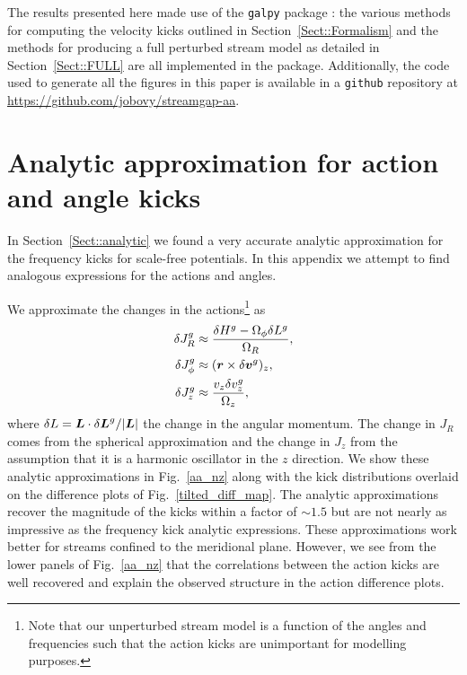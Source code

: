 \documentclass[useAMS,usenatbib,fleqn,a4paper]{mn2e}
\newcommand{\bs}[1]{\bmath{#1}}
\begin{document}
The results presented here made use of the \texttt{galpy} package \citep{galpy}: the various methods for computing the velocity kicks outlined in Section~\ref{Sect::Formalism} and the methods for producing a full perturbed stream model as detailed in Section~\ref{Sect::FULL} are all implemented in the package. Additionally, the code used to generate all the figures in this paper is available in a \texttt{github} repository at \href{https://github.com/jobovy/streamgap-aa}{https://github.com/jobovy/streamgap-aa}.




\appendix

\section{Analytic approximation for action and angle kicks}\label{Appendix::Analytic}
In Section~\ref{Sect::analytic} we found a very accurate analytic approximation for the frequency kicks for scale-free potentials. In this appendix we attempt to find analogous expressions for the actions and angles.

We approximate the changes in the actions\footnote{ Note that our unperturbed stream model is a function of the angles and frequencies such that the action kicks are unimportant for modelling purposes.} as
\begin{equation}
\begin{split}
\delta J^g_R &\approx \frac{\delta H^g - \Omega_\phi\delta L^g}{\Omega_R},\\
\delta J^g_\phi &\approx (\bs{r}\times\delta\bs{v}^g)_z,\\
\delta J^g_z &\approx \frac{v_z \delta v^g_z}{\Omega_z},
\end{split}
\label{dJ_an}
\end{equation}
where $\delta L = \bs{L}\cdot\delta\bs{L}^g/|\bs{L}|$ the change in the angular momentum. The change in $J_R$ comes from the spherical approximation and the change in $J_z$ from the assumption that it is a harmonic oscillator in the $z$ direction. We show these analytic approximations in Fig.~\ref{aa_nz} along with the kick distributions overlaid on the difference plots of Fig.~\ref{tilted_diff_map}. The analytic approximations recover the magnitude of the kicks within a factor of $\sim1.5$ but are not nearly as impressive as the frequency kick analytic expressions. These approximations work better for streams confined to the meridional plane. However, we see from the lower panels of Fig.~\ref{aa_nz} that the correlations between the action kicks are well recovered and explain the observed structure in the action difference plots.
\end{document}
